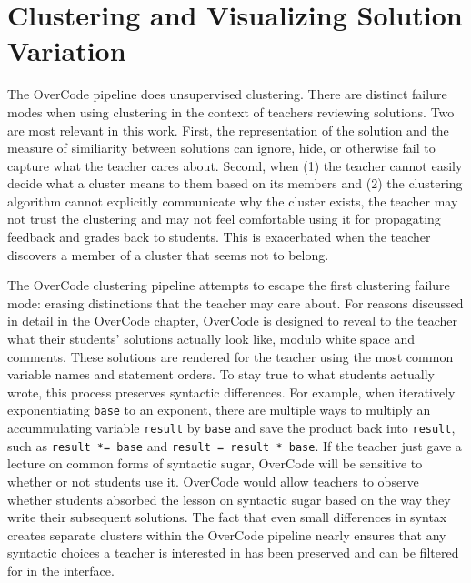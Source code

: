 \section{Clustering and Visualizing Solution Variation}
The OverCode pipeline does unsupervised clustering. There are distinct failure modes when using clustering in the context of teachers reviewing solutions. Two are most relevant in this work. First, the representation of the solution and the measure of similiarity between solutions can ignore, hide, or otherwise fail to capture what the teacher cares about. Second, when (1) the teacher cannot easily decide what a cluster means to them based on its members and (2) the clustering algorithm cannot explicitly communicate why the cluster exists, the teacher may not trust the clustering and may not feel comfortable using it for propagating feedback and grades back to students. This is exacerbated when the teacher discovers a member of a cluster that seems not to belong.

The OverCode clustering pipeline attempts to escape the first clustering failure mode: erasing distinctions that the teacher may care about. For reasons discussed in detail in the OverCode chapter, OverCode is designed to reveal to the teacher what their students' solutions actually look like, modulo white space and comments. These solutions are rendered for the teacher using the most common variable names and statement orders. To stay true to what students actually wrote, this process preserves syntactic differences. For example, when iteratively exponentiating \texttt{base} to an exponent, there are multiple ways to multiply an accummulating variable \texttt{result} by \texttt{base} and save the product back into \texttt{result}, such as \texttt{result *= base} and \texttt{result = result * base}. If the teacher just gave a lecture on common forms of syntactic sugar, OverCode will be sensitive to whether or not students use it. OverCode would allow teachers to observe whether students absorbed the lesson on syntactic sugar based on the way they write their subsequent solutions. The fact that even small differences in syntax creates separate clusters within the OverCode pipeline nearly ensures that any syntactic choices a teacher is interested in has been preserved and can be filtered for in the interface.




